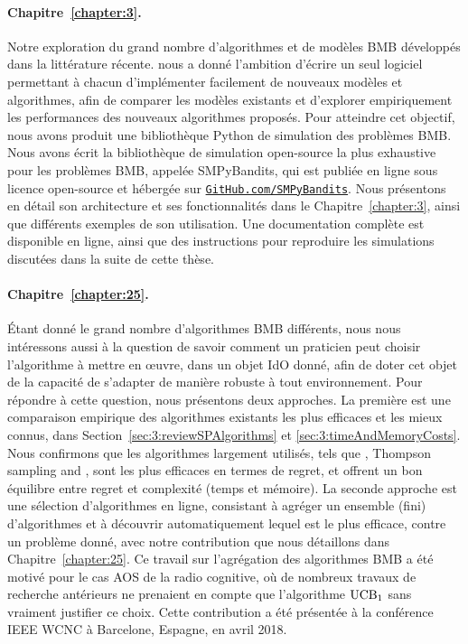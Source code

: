 \begin{resume_fr}
\paragraph{Chapitre~\ref{chapter:3}.}
%
Notre exploration du grand nombre d'algorithmes et de modèles BMB développés dans la littérature récente.
nous a donné l'ambition d'écrire un seul logiciel permettant à chacun d'implémenter facilement de nouveaux modèles et algorithmes, afin de comparer les modèles existants et d'explorer empiriquement les performances des nouveaux algorithmes proposés.
Pour atteindre cet objectif, nous avons produit une bibliothèque Python de simulation des problèmes BMB.
%
Nous avons écrit la bibliothèque de simulation open-source la plus exhaustive pour les problèmes BMB, appelée SMPyBandits, qui est publiée en ligne sous licence open-source \cite{SMPyBanditsJMLR,SMPyBandits} et hébergée sur \href{https://GitHub.com/SMPyBandits}{\texttt{GitHub.com/SMPyBandits}}.
Nous présentons en détail son architecture et ses fonctionnalités dans le Chapitre~\ref{chapter:3}, ainsi que différents exemples de son utilisation.
Une documentation complète est disponible en ligne, ainsi que des instructions pour reproduire les simulations discutées dans la suite de cette thèse.


\paragraph{Chapitre~\ref{chapter:25}.}
%
Étant donné le grand nombre d'algorithmes BMB différents, nous nous intéressons aussi à la question de savoir comment un praticien peut choisir l'algorithme à mettre en œuvre, dans un objet IdO donné, afin de doter cet objet de la capacité de s'adapter de manière robuste à tout environnement.
Pour répondre à cette question, nous présentons deux approches.
La première est une comparaison empirique des algorithmes existants les plus efficaces et les mieux connus, dans Section~\ref{sec:3:reviewSPAlgorithms} et \ref{sec:3:timeAndMemoryCosts}.
Nous confirmons que les algorithmes largement utilisés, tels que \UCB{} \cite{Auer02}, Thompson sampling \cite{Thompson33} and \klUCB{} \cite{KLUCBJournal}, sont les plus efficaces en termes de regret, et offrent un bon équilibre entre regret et complexité (temps et mémoire).
La seconde approche est une sélection d'algorithmes en ligne, consistant à agréger un ensemble (fini) d'algorithmes et à découvrir automatiquement lequel est le plus efficace, contre un problème donné, avec notre contribution \Aggr{} que nous détaillons dans Chapitre~\ref{chapter:25}.
Ce travail sur l'agrégation des algorithmes BMB a été motivé pour le cas AOS de la radio cognitive, où de nombreux travaux de recherche antérieurs ne prenaient en compte que l'algorithme $\mathrm{UCB}_1$ sans vraiment justifier ce choix.
Cette contribution a été présentée à la conférence IEEE WCNC à Barcelone, Espagne, en avril 2018.



\end{resume_fr}
